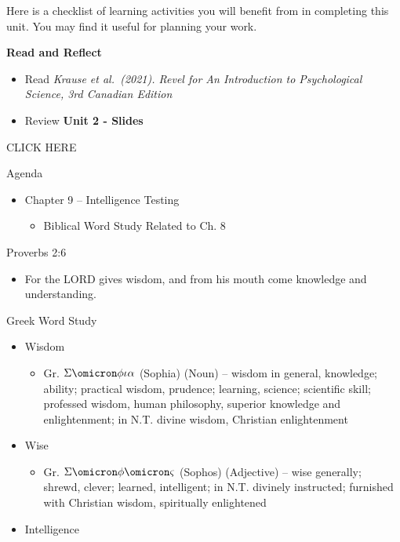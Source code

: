 \documentclass[
]{book}
\providecommand{\tightlist}{%
  \setlength{\itemsep}{0pt}\setlength{\parskip}{0pt}}
\begin{document}
\begin{reflect}
Here is a checklist of learning activities you will benefit from in completing this unit. You may find it useful for planning your work.

\textbf{Read and Reflect}

\begin{itemize}
\tightlist
\item
  Read \emph{Krause et al.~(2021). Revel for An Introduction to Psychological Science, 3rd Canadian Edition}\\
\item
  Review \textbf{Unit 2 - Slides}
\end{itemize}

CLICK HERE

Agenda

\begin{itemize}
\tightlist
\item
  Chapter 9 -- Intelligence Testing

  \begin{itemize}
  \tightlist
  \item
    Biblical Word Study Related to Ch. 8
  \end{itemize}
\end{itemize}

Proverbs 2:6

\begin{itemize}
\tightlist
\item
  For the LORD gives wisdom, and from his mouth come knowledge and understanding.
\end{itemize}

Greek Word Study

\begin{itemize}
\tightlist
\item
  Wisdom

  \begin{itemize}
  \tightlist
  \item
    Gr. \(\Sigma\omicron\phi\iota\alpha\) (Sophia) (Noun) -- wisdom in general, knowledge; ability; practical wisdom, prudence; learning, science; scientific skill; professed wisdom, human philosophy, superior knowledge and enlightenment; in N.T. divine wisdom, Christian enlightenment\\
  \end{itemize}
\item
  Wise

  \begin{itemize}
  \tightlist
  \item
    Gr. \(\Sigma\omicron\phi\omicron\varsigma\) (Sophos) (Adjective) -- wise generally; shrewd, clever; learned, intelligent; in N.T. divinely instructed; furnished with Christian wisdom, spiritually enlightened
  \end{itemize}
\item
  Intelligence


\end{itemize}
\end{reflect}
\end{document}
